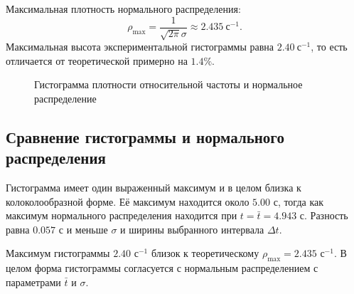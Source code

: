 \documentclass[12pt]{article}
\begin{document}
	Максимальная плотность нормального распределения:
	\[
		\rho_{\max} = \frac{1}{\sqrt{2 \pi} \sigma}
		\approx 2.435 \ \text{с}^{-1}.
	\]
	Максимальная высота экспериментальной гистограммы равна
	$2.40 \ \text{с}^{-1}$, то есть отличается от теоретической примерно на $1.4\%$.

	\begin{figure}[H]
		\centering
		\caption{Гистограмма плотности относительной частоты и нормальное распределение}
		\label{fig:hist}
	\end{figure}

	\subsection{Сравнение гистограммы и нормального распределения}
	
	Гистограмма имеет один выраженный максимум и в целом близка к колоколообразной форме. Её максимум находится около $5.00$ с, тогда как максимум нормального распределения находится при $t = \bar t = 4.943$ с. Разность равна $0.057$ с и меньше $\sigma$ и ширины выбранного интервала $\Delta t$.

	Максимум гистограммы $2.40$ с$^{-1}$ близок к теоретическому $\rho_{\max} = 2.435$ с$^{-1}$. В целом форма гистограммы согласуется с нормальным распределением с параметрами $\bar t$ и $\sigma$.
\end{document}
